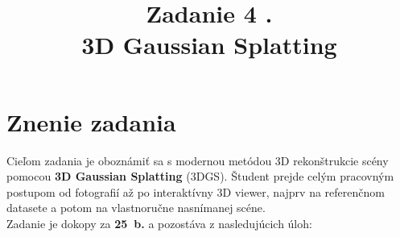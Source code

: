 \documentclass{article}
\title{Zadanie 4 . \\ 3D Gaussian Splatting}
\date{}
\begin{document}
\maketitle

\section*{Znenie zadania}

Cieľom zadania je oboznámiť sa s modernou metódou 3D rekonštrukcie scény pomocou
\textbf{3D Gaussian Splatting} (3DGS).
Študent prejde celým pracovným postupom od fotografií až po interaktívny 3D viewer,
najprv na referenčnom datasete a potom na vlastnoručne nasnímanej scéne.
\\[4pt]
Zadanie je dokopy za \textbf{25~b.} a pozostáva z nasledujúcich úloh:
\end{document}
